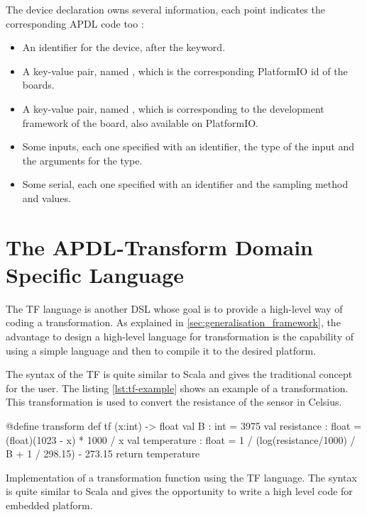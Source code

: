 The device declaration owns several information, each point indicates the
corresponding APDL code too :
\begin{itemize}
\item An identifier for the device, after the  keyword.
\item A key-value pair, named , which is the corresponding
  PlatformIO id of the boards\cite{Ivan2017}.
\item A key-value pair, named , which is corresponding to
  the development framework of the board, also available on PlatformIO\cite{Ivan2017}.
\item Some inputs, each one specified with an identifier, the type of the input
  and the arguments for the type.
\item Some serial, each one specified with an identifier and the sampling method
  and values.
\end{itemize}

\section{The APDL-Transform Domain Specific Language}
\label{sec:transformation_dsl}

The \gls{TF} language is another \gls{DSL} whose goal is to provide a high-level way of
coding a transformation. As explained in \ref{sec:generalisation_framework}, the
advantage to design a high-level language for transformation is the capability
of using a simple language and then to compile it to the desired platform.

The syntax of the \gls{TF} is quite similar to Scala and gives the traditional
concept for the user. The listing \ref{lst:tf-example} shows an example of a
transformation. This transformation is used to convert the resistance of the
sensor in Celsius.

\begin{listing}[H]
  \centering
\begin{apdlcode}
@define transform def tf (x:int) -> float {
    val B : int = 3975
    val resistance : float = (float)(1023 - x) * 1000 / x
    val temperature : float = 1 / (log(resistance/1000) / B + 1 / 298.15) - 273.15
    return temperature
}
\end{apdlcode}
  \caption[APDL transformation implement with the \gls{TF}
  language]{Implementation of a transformation function using the \gls{TF}
    language. The syntax is quite similar to Scala and gives the opportunity to
    write a high level code for embedded platform.}
  \label{lst:tf-example}
\end{listing}

